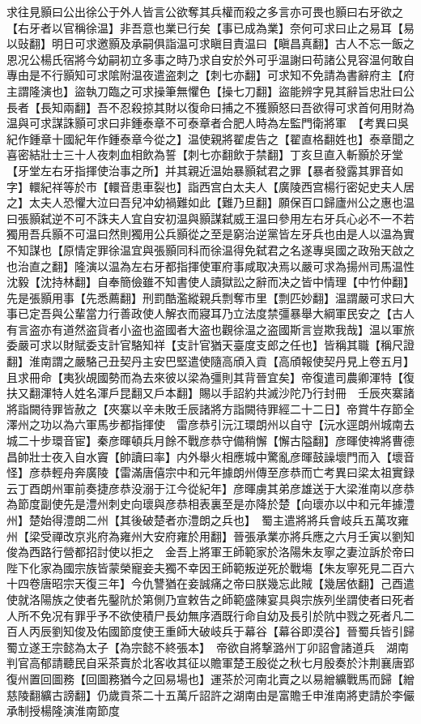 求往見顥曰公出徐公于外人皆言公欲奪其兵權而殺之多言亦可畏也顥曰右牙欲之【右牙者以官稱徐温】非吾意也業已行矣【事已成為業】奈何可求曰止之易耳【易以䜴翻】明日可求邀顥及承嗣俱詣温可求瞋目責温曰【瞋昌真翻】古人不忘一飯之恩况公楊氏宿將今幼嗣初立多事之時乃求自安於外可乎温謝曰苟諸公見容温何敢自專由是不行顥知可求隂附温夜遣盗刺之【刺七亦翻】可求知不免請為書辭府主【府主謂隆演也】盜執刀臨之可求操筆無懼色【操七刀翻】盜能辨字見其辭旨忠壯曰公長者【長知兩翻】吾不忍殺掠其財以復命曰捕之不獲顥怒曰吾欲得可求首何用財為温與可求謀誅顥可求曰非鍾泰章不可泰章者合肥人時為左監門衛將軍　【考異曰吳紀作鍾章十國紀年作鍾泰章今從之】温使親將翟䖍告之【翟直格翻姓也】泰章聞之喜密結壯士三十人夜刺血相飲為誓【刺七亦翻飲于禁翻】丁亥旦直入斬顥於牙堂【牙堂左右牙指揮使治事之所】并其親近温始暴顥弑君之罪【暴者發露其罪音如字】轘紀祥等於市【轘音患車裂也】詣西宫白太夫人【廣陵西宫楊行密妃史夫人居之】太夫人恐懼大泣曰吾兒冲幼禍難如此【難乃旦翻】願保百口歸廬州公之惠也温曰張顥弑逆不可不誅夫人宜自安初温與顥謀弑威王温曰參用左右牙兵心必不一不若獨用吾兵顥不可温曰然則獨用公兵顥從之至是窮治逆黨皆左牙兵也由是人以温為實不知謀也【原情定罪徐温宜與張顥同科而徐温得免弑君之名遂專吳國之政殆天啟之也治直之翻】隆演以温為左右牙都指揮使軍府事咸取决焉以嚴可求為揚州司馬温性沈毅【沈持林翻】自奉簡儉雖不知書使人讀獄訟之辭而决之皆中情理【中竹仲翻】先是張顥用事【先悉薦翻】刑罰酷濫縱親兵剽奪市里【剽匹妙翻】温謂嚴可求曰大事已定吾與公輩當力行善政使人解衣而寢耳乃立法度禁彊暴舉大綱軍民安之【古人有言盗亦有道然盗貨者小盗也盗國者大盗也觀徐温之盗國斯言豈欺我哉】温以軍旅委嚴可求以財賦委支計官駱知祥【支計官猶天臺度支郎之任也】皆稱其職【稱尺證翻】淮南謂之嚴駱己丑契丹主安巴堅遣使隨高頎入貢【高頎報使契丹見上卷五月】且求冊命【夷狄覘國勢而為去來彼以梁為彊則其背晉宜矣】帝復遣司農卿渾特【復扶又翻渾特人姓名渾戶昆翻又戶本翻】賜以手詔約共滅沙陀乃行封冊　壬辰夾寨諸將詣闕待罪皆赦之【夾寨以辛未敗壬辰諸將方詣闕待罪經二十二日】帝賞牛存節全澤州之功以為六軍馬步都指揮使　雷彦恭引沅江環朗州以自守【沅水逕朗州城南去城二十步環音宦】秦彦暉頓兵月餘不戰彦恭守備稍懈【懈古隘翻】彦暉使禆將曹德昌帥壯士夜入自水竇【帥讀曰率】内外舉火相應城中驚亂彦暉鼓譟壞門而入【壞音怪】彦恭輕舟奔廣陵【雷滿唐僖宗中和元年據朗州傳至彦恭而亡考異曰梁太祖實録云丁酉朗州軍前奏捷彦恭没溺于江今從紀年】彦暉虜其弟彦雄送于大梁淮南以彦恭為節度副使先是澧州刺史向瓌與彦恭相表裏至是亦降於楚【向瓌亦以中和元年據澧州】楚始得澧朗二州【其後破楚者亦澧朗之兵也】　蜀主遣將將兵會岐兵五萬攻雍州【梁受禪改京兆府為雍州大安府雍於用翻】晉張承業亦將兵應之六月壬寅以劉知俊為西路行營都招討使以拒之　金吾上將軍王師範家於洛陽朱友寧之妻泣訴於帝曰陛下化家為國宗族皆蒙榮寵妾夫獨不幸因王師範叛逆死於戰塲【朱友寧死見二百六十四卷唐昭宗天復三年】今仇讐猶在妾誠痛之帝曰朕幾忘此賊【幾居依翻】己酉遣使就洛陽族之使者先鑿阬於第側乃宣敕告之師範盛陳宴具與宗族列坐謂使者曰死者人所不免况有罪乎予不欲使積尸長幼無序酒既行命自幼及長引於阬中戮之死者凡二百人丙辰劉知俊及佑國節度使王重師大破岐兵于幕谷【幕谷即漠谷】晉蜀兵皆引歸　蜀立遂王宗懿為太子【為宗懿不終張本】　帝欲自將撃潞州丁卯詔會諸道兵　湖南判官高郁請聽民自采茶賣於北客收其征以贍軍楚王殷從之秋七月殷奏於汴荆襄唐郢復州置回圖務【回圖務猶今之回易場也】運茶於河南北賣之以易繒纊戰馬而歸【繒慈陵翻纊古謗翻】仍歲貢茶二十五萬斤詔許之湖南由是富贍壬申淮南將吏請於李儼承制授楊隆演淮南節度

